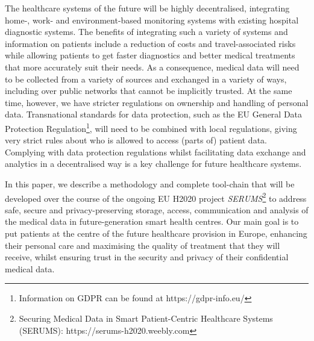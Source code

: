 \noindent
The healthcare systems of the future will be highly decentralised, integrating home-, work- and environment-based monitoring systems with existing hospital diagnostic systems. The benefits of integrating such a variety of systems and information on patients include a reduction of costs and travel-associated risks while allowing patients to get faster diagnostics and better medical treatments that more accurately suit their needs. %
As a consequence, medical data will need to be collected from a variety of sources and exchanged in a variety of ways, including over public networks that cannot be implicitly trusted. At the same time, however, we have stricter regulations on ownership and handling of personal data. Transnational standards for data protection, such as the EU General Data Protection Regulation\footnote{Information on GDPR can be found at https://gdpr-info.eu/}, will need to be combined with local regulations, giving very strict rules about who is allowed to access (parts of) patient data. Complying with data protection regulations whilst facilitating data exchange and analytics in a decentralised way is a key challenge for future healthcare systems.


In this paper, we describe a methodology and complete tool-chain that will be developed over the course of the ongoing EU H2020 project \emph{SERUMS}\footnote{Securing Medical Data in Smart Patient-Centric Healthcare Systems (SERUMS): https://serums-h2020.weebly.com} to address  safe, secure and privacy-preserving storage, access, communication and analysis of the medical data in future-generation smart health centres. Our main goal is to put patients at the centre of the future healthcare provision in Europe, enhancing their personal care and maximising the quality of treatment that they will receive, whilst ensuring trust in the security and privacy of their confidential medical data. 

